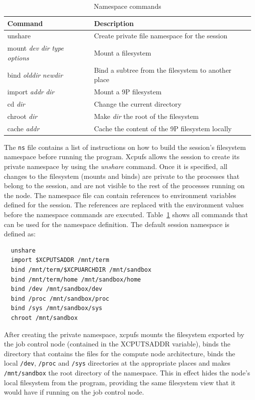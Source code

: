 \documentclass[10pt,conference,letterpaper]{IEEEtran}
\begin{document}
\begin{table}[ht]
\begin{center}
\begin{tabular}{lp{1.9in}}
    Command & Description\\
    \hline
    unshare & Create private file namespace for the session\\
    mount \textsl{dev} \textsl{dir} \textsl{type} \textsl{options} & Mount a filesystem\\
    bind \textsl{olddir} \textsl{newdir} & Bind a subtree from the filesystem to another place \\
    import \textsl{addr} \textsl{dir} & Mount a 9P filesystem\\
    cd \textsl{dir} & Change the current directory\\
    chroot \textsl{dir} & Make \textsl{dir} the root of the filesystem\\
    cache \textsl{addr} & Cache the content of the 9P filesystem locally\\
\end{tabular}
\caption{Namespace commands}
\label{tbl:xcpu2-ns}
\end{center}
\end{table}

The \texttt{ns} file contains a list of instructions on how to build the
session's filesystem namespace before running the program. Xcpufs allows the
session to create its private namespace by using the \textsl{unshare}
command. Once it is specified, all changes to the filesystem (mounts and
binds) are private to the processes that belong to the session, and are not
visible to the rest of the processes running on the node. The namespace file
can contain references to environment variables defined for the session. The
references are replaced with the environment values before the namespace
commands are executed. Table~\ref{tbl:xcpu2-ns} shows all commands that can
be used for the namespace definition. The default session namespace is
defined as:

\begin{verbatim}
  unshare
  import $XCPUTSADDR /mnt/term
  bind /mnt/term/$XCPUARCHDIR /mnt/sandbox
  bind /mnt/term/home /mnt/sandbox/home
  bind /dev /mnt/sandbox/dev
  bind /proc /mnt/sandbox/proc
  bind /sys /mnt/sandbox/sys
  chroot /mnt/sandbox
\end{verbatim}

After creating the private namespace, xcpufs mounts the filesystem exported
by the job control node (contained in the XCPUTSADDR variable), binds the
directory that contains the files for the compute node architecture, binds
the local \texttt{/dev}, \texttt{/proc} and \texttt{/sys} directories at the
appropriate places and makes \texttt{/mnt/sandbox} the root directory of the
namespace. This in effect hides the node's local filesystem from the
program, providing the same filesystem view that it would have if running on
the job control node.
\end{document}
